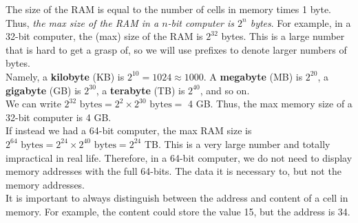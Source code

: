 \documentclass[]{article}
\begin{document}
The size of the RAM is equal to the number of cells in memory times 1 byte. Thus, \textit{the max size of the RAM in a $n$-bit computer is $2^n$ bytes}. For example, in a 32-bit computer, the (max) size of the RAM is $2^{32}$ bytes. This is a large number that is hard to get a grasp of, so we will use prefixes to denote larger numbers of bytes.\\

Namely, a \textbf{kilobyte} (KB) is $2^{10} = 1024 \approx 1000$. A \textbf{megabyte} (MB) is $2^{20}$, a \textbf{gigabyte} (GB) is $2^{30}$, a \textbf{terabyte} (TB) is $2^{40}$, and so on.\\

We can write $2^{32}\text{ bytes} = 2^{2} \times 2^{30}\text{ bytes} =$ 4 GB. Thus, the max memory size of a 32-bit computer is 4 GB.\\

If instead we had a 64-bit computer, the max RAM size is $2^{64}\text{ bytes} = 2^{24} \times 2^{40}\text{ bytes} = 2^{24}$ TB. This is a very large number and totally impractical in real life. Therefore, in a 64-bit computer, we do not need to display memory addresses with the full 64-bits. The data it is necessary to, but not the memory addresses.\\

It is important to always distinguish between the address and content of a cell in memory. For example, the content could store the value 15, but the address is 34. \\
\end{document}
